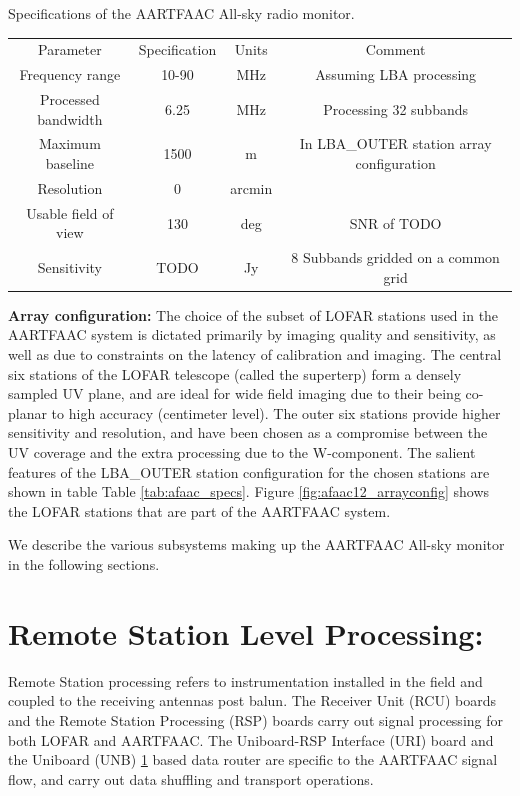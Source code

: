 \documentclass{ws-jai}
\begin{document}
\begin{wstable}[h]
\caption{Specifications of the AARTFAAC All-sky radio monitor.}
\begin{tabular}{@{}cccc@{}} \toprule
Parameter & Specification & Units & Comment\\ \colrule
Frequency range & 10-90 & MHz & Assuming LBA processing  \\
Processed bandwidth & 6.25 & MHz & Processing 32 subbands \\
Maximum baseline & 1500 & m & In LBA\_OUTER station array configuration\\
Resolution & 0 & arcmin & \\
Usable field of view & 130 & deg & SNR of TODO \\
Sensitivity & TODO & Jy & 8 Subbands gridded on a common grid \\

\end{tabular}
\label{tab:afaac_specs}
\end{wstable}

\noindent  \textbf {Array  configuration:} The  choice  of the  subset of  LOFAR
stations used  in the AARTFAAC system  is dictated primarily by  imaging quality
and sensitivity, as well as due to constraints on the latency of calibration and
imaging. The central six stations of  the LOFAR telescope (called the superterp)
form a  densely sampled UV plane,  and are ideal  for wide field imaging  due to
their  being co-planar  to  high  accuracy (centimeter  level).   The outer  six
stations provide  higher sensitivity and resolution,  and have been chosen  as a
compromise  between  the  UV  coverage  and the  extra  processing  due  to  the
W-component.  The salient  features of the LBA\_OUTER  station configuration for
the  chosen stations  are shown  in table  Table \ref{tab:afaac_specs}.   Figure
\ref{fig:afaac12_arrayconfig}  shows the  LOFAR stations  that are  part of  the
AARTFAAC system.

We describe the various subsystems making up the AARTFAAC All-sky monitor in the
following sections.

\section {\label{sec:station_hardware} Remote Station Level Processing:} 
Remote Station processing  refers to instrumentation installed in  the field and
coupled to the receiving antennas post balun. The Receiver Unit (RCU) boards and
the Remote Station Processing (RSP) boards  carry out signal processing for both
LOFAR and  AARTFAAC.  The  Uniboard-RSP Interface (URI)  board and  the Uniboard
(UNB) \ref{}  based data router  are specific to  the AARTFAAC signal  flow, and
carry out data shuffling and transport operations.\\
\end{document}
